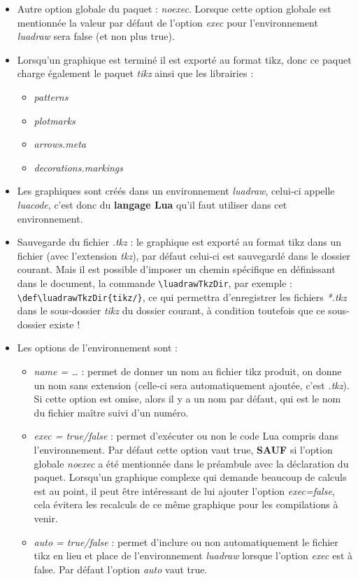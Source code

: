 \begin{itemize}
    \item Autre option globale du paquet : \emph{noexec}. Lorsque cette option globale est mentionnée la valeur par défaut de l'option \emph{exec} pour l'environnement \emph{luadraw} sera false (et non plus true).

    \item Lorsqu'un graphique est terminé il est exporté au format tikz, donc ce paquet charge également le paquet \emph{tikz} ainsi que les librairies :
    \begin{itemize}
        \item\emph{patterns}
        \item\emph{plotmarks}
        \item\emph{arrows.meta}
        \item\emph{decorations.markings}
        \end{itemize}
    \item Les graphiques sont créés dans un environnement \emph{luadraw}, celui-ci appelle \emph{luacode}, c'est donc du \textbf{langage Lua} qu'il faut utiliser dans cet environnement.

    \item Sauvegarde du fichier \emph{.tkz} : le graphique est exporté au format tikz dans un fichier (avec l'extension \emph{tkz}), par défaut celui-ci est sauvegardé dans le dossier courant. Mais il est possible d'imposer un chemin spécifique en définissant dans le document, la commande \verb|\luadrawTkzDir|, par exemple : \verb|\def\luadrawTkzDir{tikz/}|, ce qui permettra d'enregistrer les fichiers \emph{*.tkz} dans le sous-dossier \emph{tikz} du dossier courant, à condition toutefois que ce sous-dossier existe !

    \item Les options de l'environnement sont :
    \begin{itemize}
    \item \emph{name = \ldots{}} : permet de donner un nom au fichier tikz produit, on donne un nom sans extension (celle-ci sera automatiquement ajoutée, c'est \emph{.tkz}). Si cette option est omise, alors il y a un nom par défaut, qui est le nom du fichier maître suivi d'un numéro.
    \item \emph{exec = true/false} : permet d'exécuter ou non le code Lua compris dans l'environnement. Par défaut cette option vaut true, \textbf{SAUF} si l'option globale \emph{noexec} a été mentionnée dans le préambule avec la déclaration du paquet. Lorsqu'un graphique complexe qui demande beaucoup de calculs est au point, il peut être intéressant de lui ajouter l'option \emph{exec=false}, cela évitera les recalculs de ce même graphique pour les compilations à venir.
    \item \emph{auto = true/false} : permet d'inclure ou non automatiquement le fichier tikz en lieu et place de l'environnement \emph{luadraw} lorsque l'option \emph{exec} est à false. Par défaut l'option \emph{auto} vaut true.
    \end{itemize}
\end{itemize}


